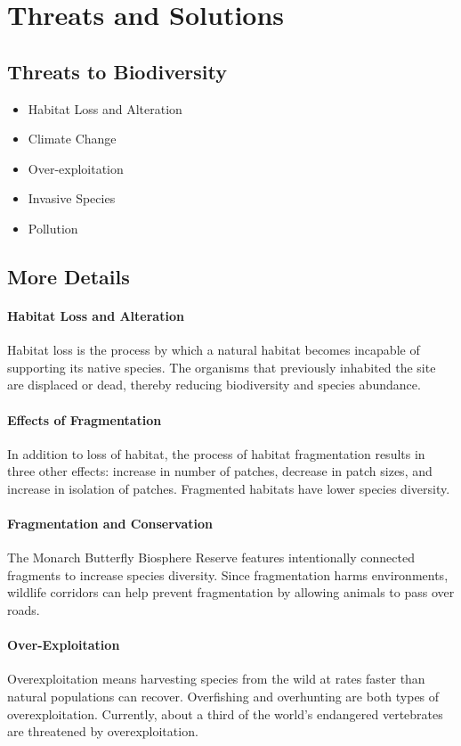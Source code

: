 \documentclass[12pt]{article}
\begin{document}
\section{Threats and Solutions}

\subsection{Threats to Biodiversity}
\begin{itemize}
    \item Habitat Loss and Alteration
    \item Climate Change
    \item Over-exploitation
    \item Invasive Species
    \item Pollution
\end{itemize}

\subsection{More Details}

\paragraph{Habitat Loss and Alteration}
Habitat loss is the process by which a natural habitat becomes incapable of supporting its native species. The organisms that previously inhabited the site are displaced or dead, thereby reducing biodiversity and species abundance.

\paragraph{Effects of Fragmentation}
In addition to loss of habitat, the process of habitat fragmentation results in three other effects: increase in number of patches, decrease in patch sizes, and increase in isolation of patches. Fragmented habitats have lower species diversity.

\paragraph{Fragmentation and Conservation}
The Monarch Butterfly Biosphere Reserve features intentionally connected fragments to increase species diversity. Since fragmentation harms environments, wildlife corridors can help prevent fragmentation by allowing animals to pass over roads. 

\paragraph{Over-Exploitation}
Overexploitation means harvesting species from the wild at rates faster than natural populations can recover. Overfishing and overhunting are both types of overexploitation. Currently, about a third of the world's endangered vertebrates are threatened by overexploitation.
\end{document}
